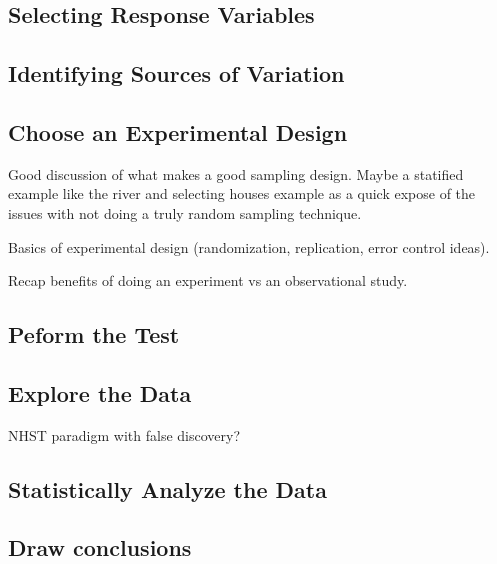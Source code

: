 \documentclass[
]{book}
\theoremstyle{definition}
\theoremstyle{definition}
\theoremstyle{definition}
\theoremstyle{remark}
\begin{document}
\hypertarget{selecting-response-variables-1}{%
\subsection{Selecting Response Variables}\label{selecting-response-variables-1}}

\hypertarget{identifying-sources-of-variation-1}{%
\subsection{Identifying Sources of Variation}\label{identifying-sources-of-variation-1}}

\hypertarget{choose-an-experimental-design-1}{%
\subsection{Choose an Experimental Design}\label{choose-an-experimental-design-1}}

Good discussion of what makes a good sampling design. Maybe a statified example like the river and selecting houses example as a quick expose of the issues with not doing a truly random sampling technique.

Basics of experimental design (randomization, replication, error control ideas).

Recap benefits of doing an experiment vs an observational study.

\hypertarget{peform-the-test-1}{%
\subsection{Peform the Test}\label{peform-the-test-1}}

\hypertarget{explore-the-data}{%
\subsection{Explore the Data}\label{explore-the-data}}

NHST paradigm with false discovery?

\hypertarget{statistically-analyze-the-data-1}{%
\subsection{Statistically Analyze the Data}\label{statistically-analyze-the-data-1}}

\hypertarget{draw-conclusions-1}{%
\subsection{Draw conclusions}\label{draw-conclusions-1}}
\end{document}
